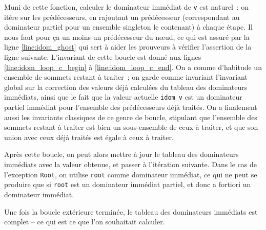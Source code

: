 \documentclass[a4paper,10pt]{article}
\begin{document}
Muni de cette fonction, calculer le dominateur immédiat de \lstinline{v} est naturel~: on itère sur les prédécesseurs, en rajoutant un prédécesseur (correspondant au dominateur partiel pour un ensemble singleton le contenant) à chaque étape. Il nous faut pour ça un moins un prédécesseur du nœud, ce qui est assuré par la ligne \ref{line:idom_ghost} qui sert à aider les prouveurs à vérifier l'assertion de la ligne suivante. L'invariant de cette boucle est donné aux lignes \ref{line:idom_loop_c_begin} à \ref{line:idom_loop_c_end}. On a comme d'habitude un ensemble de sommets restant à traiter~; on garde comme invariant l'invariant global sur la correction des valeurs déjà calculées du tableau des dominateurs immédiats, ainsi que le fait que la valeur actuelle \lstinline{idom_v} est un dominateur partiel immédiat pour l'ensemble des prédécesseurs déjà traités. On a finalement aussi les invariants classiques de ce genre de boucle, stipulant que l'ensemble des sommets restant à traiter est bien un sous-ensemble de ceux à traiter, et que son union avec ceux déjà traités est égale à ceux à traiter.

Après cette boucle, on peut alors mettre à jour le tableau des dominateurs immédiats avec la valeur obtenue, et passer à l'itération suivante. Dans le cas de l'exception \lstinline{Root}, on utilise \lstinline{root} comme dominateur immédiat, ce qui ne peut se produire que si \lstinline{root} est un dominateur immédiat partiel, et donc a fortiori un dominateur immédiat.

Une fois la boucle extérieure terminée, le tableau des dominateurs immédiats est complet -- ce qui est ce que l'on souhaitait calculer.

%
\end{document}
